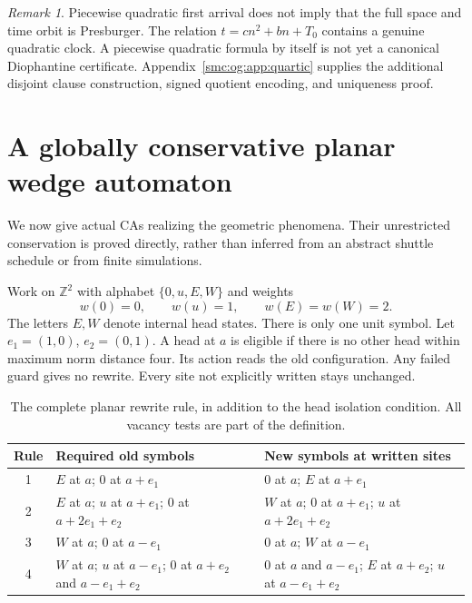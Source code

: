 \documentclass[11pt,letterpaper]{article}
\numberwithin{equation}{section}
\theoremstyle{definition}
\theoremstyle{remark}
\newtheorem{remark}[theorem]{Remark}
\newcommand{\Z}{\mathbb Z}
\begin{document}
\begin{remark}
Piecewise quadratic first arrival does not imply that the full space and time orbit is Presburger. The relation $t=cn^2+bn+T_0$ contains a genuine quadratic clock. A piecewise quadratic formula by itself is not yet a canonical Diophantine certificate. Appendix~\ref{smc:og:app:quartic} supplies the additional disjoint clause construction, signed quotient encoding, and uniqueness proof.
\end{remark}

\section{A globally conservative planar wedge automaton}\label{smc:og:sec:wedge}
We now give actual CAs realizing the geometric phenomena. Their unrestricted conservation is proved directly, rather than inferred from an abstract shuttle schedule or from finite simulations.

Work on $\Z^2$ with alphabet $\{0,u,E,W\}$ and weights
\[
 w(0)=0,\qquad w(u)=1,\qquad w(E)=w(W)=2.
\]
The letters $E,W$ denote internal head states. There is only one unit symbol. Let $e_1=(1,0)$, $e_2=(0,1)$. A head at $a$ is eligible if there is no other head within maximum norm distance four. Its action reads the old configuration. Any failed guard gives no rewrite. Every site not explicitly written stays unchanged.

\begin{table}[ht]
\centering\small
\renewcommand{\arraystretch}{1.5}
\begin{tabular}{@{}c p{2.45in} p{2.65in}@{}}
\toprule
Rule & Required old symbols & New symbols at written sites\\
\midrule
1 & $E$ at $a$; $0$ at $a+e_1$ & $0$ at $a$; $E$ at $a+e_1$\\
2 & $E$ at $a$; $u$ at $a+e_1$; $0$ at $a+2e_1+e_2$ & $W$ at $a$; $0$ at $a+e_1$; $u$ at $a+2e_1+e_2$\\
3 & $W$ at $a$; $0$ at $a-e_1$ & $0$ at $a$; $W$ at $a-e_1$\\
4 & $W$ at $a$; $u$ at $a-e_1$; $0$ at $a+e_2$ and $a-e_1+e_2$ & $0$ at $a$ and $a-e_1$; $E$ at $a+e_2$; $u$ at $a-e_1+e_2$\\
\bottomrule
\end{tabular}
\caption{The complete planar rewrite rule, in addition to the head isolation condition. All vacancy tests are part of the definition.}
\label{smc:og:tab:rule}
\end{table}
\end{document}
